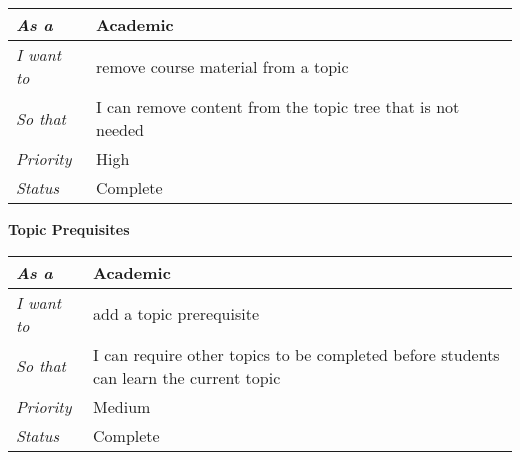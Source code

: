 \begin{table}[h!]
\begin{tabular}{|l|l|}
\hline
\textit{As a}      & Academic                                                    \\ \hline
\textit{I want to} & remove course material from a topic                         \\ \hline
\textit{So that}   & I can remove content from the topic tree that is not needed \\ \hline
\textit{Priority}  & {\color[HTML]{FE0000} High}                                 \\ \hline
\textit{Status}    & Complete                                                    \\ \hline
\end{tabular}
\end{table}
\FloatBarrier
\textbf{Topic Prequisites}
\FloatBarrier
\begin{table}[h!]
\begin{tabular}{|l|l|}
\hline
\textit{As a}      & Academic                                                                               \\ \hline
\textit{I want to} & add a topic prerequisite                                                               \\ \hline
\textit{So that}   & I can require other topics to be completed before students can learn the current topic \\ \hline
\textit{Priority}  & {\color[HTML]{FE996B} Medium}                                                            \\ \hline
\textit{Status}    & Complete                                                                               \\ \hline
\end{tabular}
\end{table}

